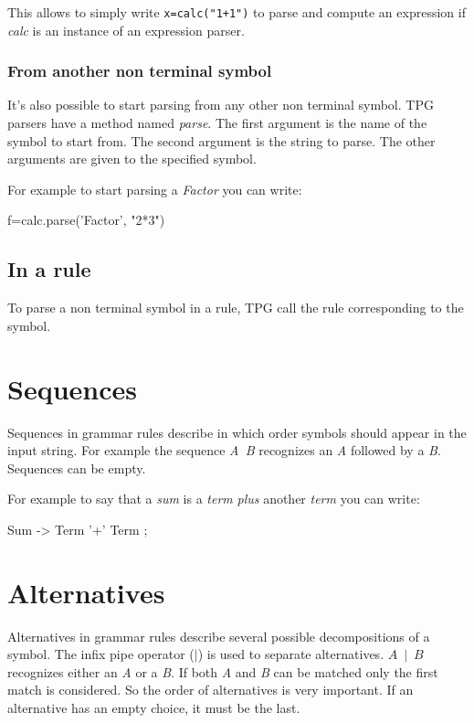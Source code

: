 This allows to simply write \verb!x=calc("1+1")! to parse and compute an expression if \emph{calc} is an instance of an expression parser.

\subsubsection{From another non terminal symbol}

It's also possible to start parsing from any other non terminal symbol.
TPG parsers have a method named \emph{parse}.
The first argument is the name of the symbol to start from.
The second argument is the string to parse.
The other arguments are given to the specified symbol.

For example to start parsing a \emph{Factor}
you can write:
\begin{verbatimtab}[4]
	f=calc.parse('Factor', "2*3")
\end{verbatimtab}

\subsection{In a rule}

To parse a non terminal symbol in a rule, TPG call the rule corresponding to the symbol.

\section{Sequences}
\label{parser:sequences}

Sequences in grammar rules describe in which order symbols should appear in the input string.
For example the sequence \emph{A~B} recognizes an \emph{A} followed by a \emph{B}.
Sequences can be empty.

For example to say that a \emph{sum} is a \emph{term} \emph{plus} another \emph{term} you can write:
\begin{verbatimtab}[4]
	Sum -> Term '+' Term ;
\end{verbatimtab}

\section{Alternatives}
\label{parser:alternatives}

Alternatives in grammar rules describe several possible decompositions of a symbol.
The infix pipe operator (\emph{$\mid$}) is used to separate alternatives.
\emph{$A~\mid~B$} recognizes either an \emph{A} or a \emph{B}.
If both \emph{A} and \emph{B} can be matched only the first match is considered.
So the order of alternatives is very important.
If an alternative has an empty choice, it must be the last.


